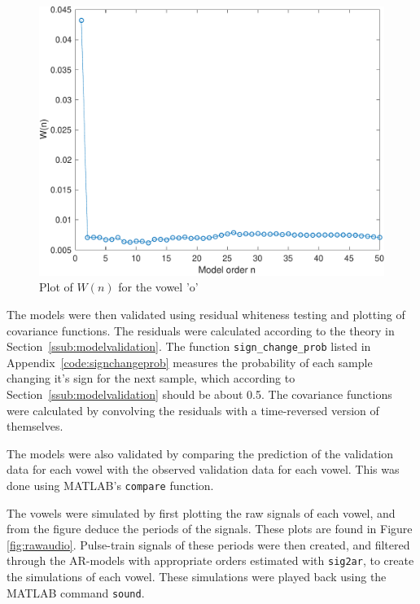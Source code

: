 \documentclass{IEEEtran}
\newcommand{\code}[1]{\texttt{#1}}
\begin{document}
\begin{figure}[h!]
    \centering
    \captionsetup{justification=centering}
    \includegraphics[width=0.8\columnwidth]{pictures/wno.pdf}
    \caption{Plot of $W(n)$ for the vowel 'o'}
    \label{fig:wno}
\end{figure}

The models were then validated using residual whiteness testing and plotting of
covariance functions. The residuals were calculated according to the theory in
Section~\ref{ssub:modelvalidation}. The function \code{sign\_change\_prob}
listed in Appendix~\ref{code:signchangeprob}
measures the probability of each sample changing it's sign for the next
sample, which according to Section~\ref{ssub:modelvalidation} should be about
0.5. The covariance functions were calculated by convolving the residuals with
a time-reversed version of themselves.

The models were also validated by comparing the prediction of the validation
data for each vowel with the observed validation data for each vowel. This was
done using MATLAB's \code{compare} function. 

The vowels were simulated by first plotting the raw signals of each vowel, and
from the figure deduce the periods of the signals. These plots are found in
Figure \ref{fig:rawaudio}. Pulse-train signals of these
periods were then created, and filtered through the AR-models with appropriate
orders estimated with \code{sig2ar}, to create the simulations of each vowel.
These simulations were played back using the MATLAB command \code{sound}.
\end{document}
